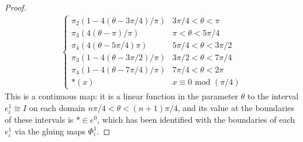 \documentclass[12pt]{article}
\theoremstyle{definition}
\newenvironment{problem}[2][Problem]{\begin{trivlist}
\item[\hskip \labelsep {\bfseries #1}\hskip \labelsep {\bfseries #2.}]}{\end{trivlist}}
\begin{document}
\begin{problem}{1}
\begin{proof}
\begin{align*}
\begin{cases}
		    \pi_2(1 - 4(\theta - 3 \pi / 4) / \pi) & 3 \pi / 4 < \theta < \pi\\
		    \pi_3(4(\theta - \pi) / \pi) & \pi < \theta < 5\pi / 4\\
		    \pi_4(4(\theta - 5 \pi / 4) \pi) & 5 \pi / 4 < \theta < 3 \pi  / 2\\
		    \pi_3(1 - 4(\theta - 3 \pi / 2)/ \pi) & 3 \pi / 2 < \theta < 7 \pi /4\\
		    \pi_4(1 - 4(\theta - 7 \pi / 4) / \pi) & 7 \pi / 4 < \theta < 2\pi\\
		    *(x) & x \equiv 0 \text{ mod } (\pi / 4)
	    \end{cases}
    \end{align*}
    This is a continuous map: it is a linear function in the parameter $\theta$ to the interval $e_i^1 \cong I$ on each domain $n\pi / 4 < \theta < (n+1)\pi / 4 $, and its value at the boundaries of these intervals is $* \in e^0$, which has been identified with the boundaries of each $e^1_i$ via the gluing maps $\Phi^1_i$.
\end{proof}
\end{problem}
\end{document}
